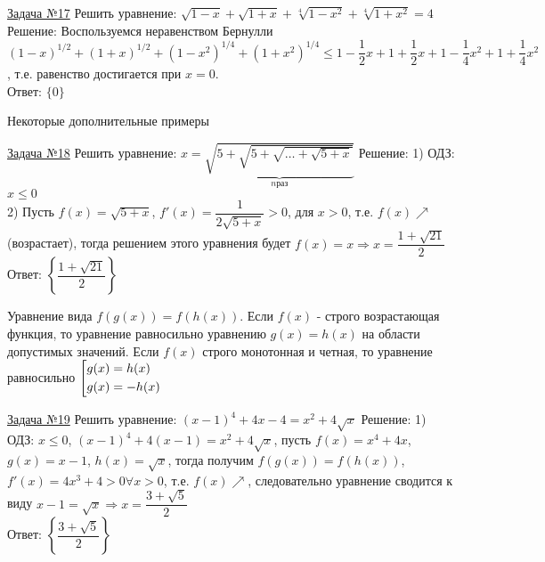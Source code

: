 \documentclass[a4paper,12pt]{article} %
\begin{document}
\label{Problem17}
\underline{Задача №17}
Решить уравнение: $\sqrt{1-x}+\sqrt{1+x}+\sqrt[4]{1-x^2}+\sqrt[4]{1+x^2}=4$\newline
Решение: Воспользуемся неравенством Бернулли $(1-x)^{1/2}+(1+x)^{1/2}+(1-x^2)^{1/4}+(1+x^2)^{1/4} \le 1-\dfrac12x+1+\dfrac12x+1-\dfrac14x^2+1+\dfrac14x^2$,
т.е. равенство достигается при $x=0$.\\
Ответ: $\{ 0 \}$

\begin{center}
{\large Некоторые дополнительные примеры}
\end{center}

\label{Problem18}
\underline{Задача №18}
Решить уравнение: $x=\underbrace{\sqrt{ 5+\sqrt{ 5+\sqrt{\ldots+\sqrt{5+x}} } }}_{n раз}$\newline
Решение: 1) ОДЗ: $x \le 0$\\
2) Пусть $f(x)=\sqrt{5+x}$, $f'(x)=\dfrac{1}{2\sqrt{5+x}}>0$, для $x>0$, т.е. $f(x) \nearrow$ (возрастает),
тогда решением этого уравнения будет $f(x)=x \Rightarrow x=\dfrac{1+\sqrt{21}}{2}$\\
Ответ: $\left\{ \dfrac{1+\sqrt{21}}{2} \right\}$

Уравнение вида $f(g(x))=f(h(x))$. Если $f(x)$ - строго возрастающая функция, то
уравнение равносильно уравнению $g(x)=h(x)$ на области допустимых значений. Если
$f(x)$ строго монотонная и четная, то уравнение равносильно
$	\left[\begin{gathered}
		g(x)=h(x) \hfill \\
		g(x)=-h(x)
	\end{gathered}\right.$
	
\label{Problem19}
\underline{Задача №19}
Решить уравнение: $(x-1)^4+4x-4=x^2+4\sqrt{x}$\newline
Решение: 1) ОДЗ: $x \le 0$, $(x-1)^4+4(x-1)=x^2+4\sqrt{x}$, пусть 
$f(x)=x^4+4x$, $g(x)=x-1$, $h(x)=\sqrt{x}$, тогда получим $f(g(x))=f(h(x))$,
$f'(x)=4x^3+4 > 0 \forall x>0$, т.е. $f(x) \nearrow$, следовательно уравнение
сводится к виду $x-1=\sqrt{x} \Rightarrow x=\dfrac{3+\sqrt5}{2}$\\
Ответ: $\left\{ \dfrac{3+\sqrt{5}}{2} \right\}$
\end{document}
